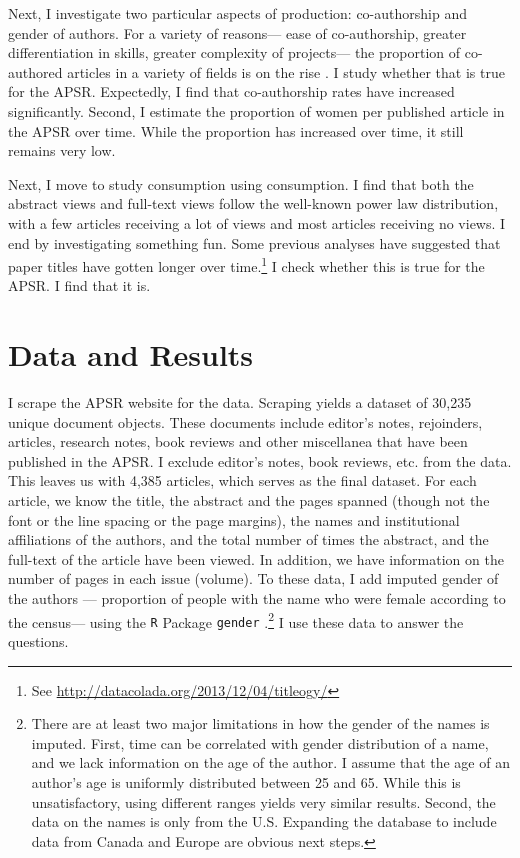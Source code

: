 \documentclass[12pt]{article}
\begin{document}
Next, I investigate two particular aspects of production: co-authorship and gender of authors. For a variety of reasons--- ease of co-authorship, greater differentiation in skills, greater complexity of projects--- the proportion of co-authored articles in a variety of fields is on the rise \citep{barnett1988rising, card2013nine, cunningham1997authorship}. I study whether that is true for the APSR. Expectedly, I find that co-authorship rates have increased significantly. Second, I estimate the proportion of women per published article in the APSR over time. While the proportion has increased over time, it still remains very low.  

Next, I move to study consumption using consumption. I find that both the abstract views and full-text views follow the well-known power law distribution, with a few articles receiving a lot of views and most articles receiving no views. I end by investigating something fun. Some previous analyses have suggested that paper titles have gotten longer over time.\footnote{See \href{http://datacolada.org/2013/12/04/titleogy/}{http://datacolada.org/2013/12/04/titleogy/}} I check whether this is true for the APSR. I find that it is.

\section*{Data and Results} 
I scrape the APSR website for the data. Scraping yields a dataset of 30,235 unique document objects. These documents include editor's notes, rejoinders, articles, research notes, book reviews and other miscellanea that have been published in the APSR. I exclude editor's notes, book reviews, etc. from the data. This leaves us with 4,385 articles, which serves as the final dataset. For each article, we know the title, the abstract and the pages spanned (though not the font or the line spacing or the page margins), the names and institutional affiliations of the authors, and the total number of times the abstract, and the full-text of the article have been viewed. In addition, we have information on the number of pages in each issue (volume). To these data, I add imputed gender of the authors --- proportion of people with the name who were female according to the census--- using the {\tt R} Package {\tt gender} \citep{lincoln2015}.\footnote{There are at least two major limitations in how the gender of the names is imputed. First, time can be correlated with gender distribution of a name, and we lack information on the age of the author. I assume that the age of an author's age is uniformly distributed between 25 and 65. While this is unsatisfactory, using different ranges yields very similar results. Second, the data on the names is only from the U.S. Expanding the database to include data from Canada and Europe are obvious next steps.} I use these data to answer the questions.
\end{document}

